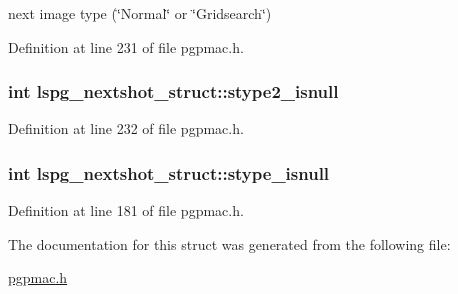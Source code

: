 next image type (\char`\"{}Normal\char`\"{} or \char`\"{}Gridsearch\char`\"{}) 

Definition at line 231 of file pgpmac.h.\hypertarget{structlspg__nextshot__struct_a203e29ed0bb403aaab6d7f95f690cc0d}{
\subsubsection[{stype2\_\-isnull}]{\setlength{\rightskip}{0pt plus 5cm}int {\bf lspg\_\-nextshot\_\-struct::stype2\_\-isnull}}}
\label{structlspg__nextshot__struct_a203e29ed0bb403aaab6d7f95f690cc0d}


Definition at line 232 of file pgpmac.h.\hypertarget{structlspg__nextshot__struct_a79f48c452a4aca8506bae22f897c7441}{
\subsubsection[{stype\_\-isnull}]{\setlength{\rightskip}{0pt plus 5cm}int {\bf lspg\_\-nextshot\_\-struct::stype\_\-isnull}}}
\label{structlspg__nextshot__struct_a79f48c452a4aca8506bae22f897c7441}


Definition at line 181 of file pgpmac.h.

The documentation for this struct was generated from the following file:\begin{DoxyCompactItemize}
\item 
\hyperlink{pgpmac_8h}{pgpmac.h}\end{DoxyCompactItemize}

